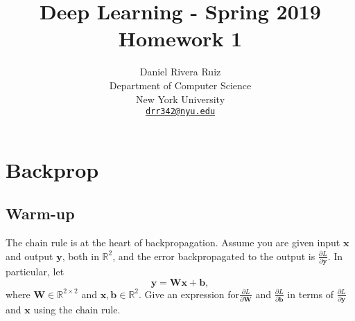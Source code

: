 \documentclass{article}
\title{Deep Learning - Spring 2019\\
       \Large Homework 1}
\author{
  Daniel Rivera Ruiz\\
  Department of Computer Science\\
  New York University\\
  \href{mailto:drr342@nyu.edu}{\texttt{drr342@nyu.edu}}\\
}
\begin{document}
\maketitle



\section{Backprop}

\subsection{Warm-up}
The chain rule is at the heart of backpropagation. Assume you are given input $\bm{x}$ and output $\bm{y}$, both in $\mathbb{R}^2$, and the error backpropagated to the output is $\frac{\partial L}{\partial \bm{y}}$. In particular, let
    \begin{equation} \label{vector}
        \bm{y} = \bm{W}\bm{x} + \bm{b},
    \end{equation}
where $\bm{W} \in \mathbb{R}^{2 \times 2}$ and $\bm{x}, \bm{b} \in \mathbb{R}^2$. Give an expression for$\frac{\partial L}{\partial \bm{W}}$ and $\frac{\partial L}{\partial \bm{b}}$ in terms of $\frac{\partial L}{\partial \bm{y}}$ and $\bm{x}$ using the chain rule.
\end{document}

